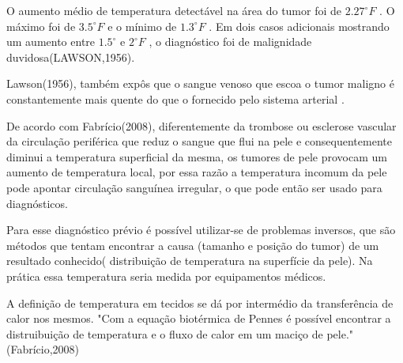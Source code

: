  O aumento médio de temperatura detectável na área do tumor foi de $ 2.27^{\circ}F$ . O máximo foi de $ 3.5^{\circ}F $ e o mínimo de $ 1.3^{\circ}F$ . Em dois casos adicionais mostrando um aumento entre $ 1.5^{\circ} $  e $ 2^{\circ}F$ , o diagnóstico foi de malignidade duvidosa(LAWSON,1956).%

  Lawson(1956), também  expôs que o sangue venoso que escoa o tumor maligno é constantemente mais quente  do que o fornecido pelo sistema arterial . %


  De acordo com Fabrício(2008), diferentemente da trombose ou esclerose vascular da circulação periférica que reduz o sangue que flui na pele e consequentemente diminui a temperatura superficial da mesma, os tumores de pele provocam um aumento de temperatura local, por essa razão a temperatura incomum da pele pode apontar circulação sanguínea irregular, o que pode então ser usado para diagnósticos.%

 Para esse diagnóstico prévio é possível utilizar-se de problemas inversos, que são métodos que tentam encontrar a causa (tamanho e posição do tumor) de um resultado conhecido( distribuição de temperatura na superfície da pele). Na prática essa temperatura seria medida por equipamentos médicos.

A definição de temperatura em tecidos se dá por intermédio da transferência de calor nos mesmos. "Com a equação biotérmica de Pennes é possível encontrar a distruibuição de temperatura e o fluxo de calor em um maciço de pele." (Fabrício,2008)%




